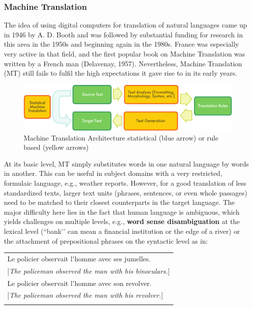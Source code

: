 \begin{multicols}{2}
\subsubsection{Machine Translation}
The idea of using digital computers for translation of natural
languages came up in 1946 by A. D. Booth and was followed by
substantial funding for research in this area in the 1950s and
beginning again in the 1980s. France was especially very active in
that field, and the first popular book on Machine Translation was
written by a French man (Delavenay, 1957). Nevertheless, Machine
Translation (MT) still fails to fulfil the high expectations it gave
rise to in its early years.

\begin{figure}
\begin{center}
 \includegraphics[width=\textwidth]{../_media/english/machine_translation}
\caption{Machine Translation Architecture statistical (blue arrow) or rule based (yellow arrows)}
\label{fig:mtarchiEng}
\end{center}
\end{figure}

At its basic level, MT simply substitutes words in one natural
language by words in another. This can be useful in subject domains
with a very restricted, formulaic language, e.g., weather
reports. However, for a good translation of less standardized texts,
larger text units (phrases, sentences, or even whole passages) need to
be matched to their closest counterparts in the target language. The
major difficulty here lies in the fact that human language is
ambiguous, which yields challenges on multiple levels, e.g., {\bf word
sense disambiguation} at the lexical level (``bank{\mbox '}{\mbox '} can mean a financial institution or the edge of a river) or the attachment of prepositional phrases on the syntactic
level as in:
\begin{tabular}{l}
\\
Le policier observait l{\mbox '}homme avec ses jumelles.\\
$[${\it The policeman observed the man with his binoculars.}$]$\\
Le policier observait l{\mbox '}homme avec son revolver.\\
$[${\it The policeman observed the man with his revolver.}$]$\\
\\
\end{tabular}


\end{multicols}
